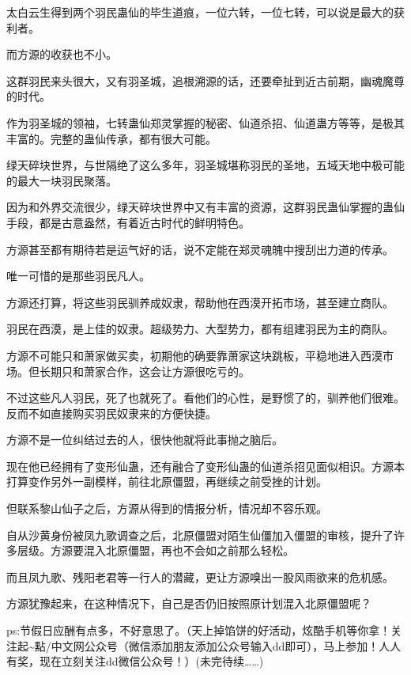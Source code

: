 \begin{this_body}
太白云生得到两个羽民蛊仙的毕生道痕，一位六转，一位七转，可以说是最大的获利者。

而方源的收获也不小。

这群羽民来头很大，又有羽圣城，追根溯源的话，还要牵扯到近古前期，幽魂魔尊的时代。

作为羽圣城的领袖，七转蛊仙郑灵掌握的秘密、仙道杀招、仙道蛊方等等，是极其丰富的。完整的蛊仙传承，都有很大可能。

绿天碎块世界，与世隔绝了这么多年，羽圣城堪称羽民的圣地，五域天地中极可能的最大一块羽民聚落。

因为和外界交流很少，绿天碎块世界中又有丰富的资源，这群羽民蛊仙掌握的蛊仙手段，都是古意盎然，有着近古时代的鲜明特色。

方源甚至都有期待若是运气好的话，说不定能在郑灵魂魄中搜刮出力道的传承。

唯一可惜的是那些羽民凡人。

方源还打算，将这些羽民驯养成奴隶，帮助他在西漠开拓市场，甚至建立商队。

羽民在西漠，是上佳的奴隶。超级势力、大型势力，都有组建羽民为主的商队。

方源不可能只和萧家做买卖，初期他的确要靠萧家这块跳板，平稳地进入西漠市场。但长期只和萧家合作，这会让方源很吃亏的。

不过这些凡人羽民，死了也就死了。看他们的心性，是野惯了的，驯养他们很难。反而不如直接购买羽民奴隶来的方便快捷。

方源不是一位纠结过去的人，很快他就将此事抛之脑后。

现在他已经拥有了变形仙蛊，还有融合了变形仙蛊的仙道杀招见面似相识。方源本打算变作另外一副模样，前往北原僵盟，再继续之前受挫的计划。

但联系黎山仙子之后，方源从得到的情报分析，情况却不容乐观。

自从沙黄身份被凤九歌调查之后，北原僵盟对陌生仙僵加入僵盟的审核，提升了许多层级。方源要混入北原僵盟，再也不会如之前那么轻松。

而且凤九歌、残阳老君等一行人的潜藏，更让方源嗅出一股风雨欲来的危机感。

方源犹豫起来，在这种情况下，自己是否仍旧按照原计划混入北原僵盟呢？

ps:节假日应酬有点多，不好意思了。（天上掉馅饼的好活动，炫酷手机等你拿！关注起\~{}點/中文网公众号（微信添加朋友添加公众号输入dd即可），马上参加！人人有奖，现在立刻关注dd微信公众号！）(未完待续……)

\end{this_body}

